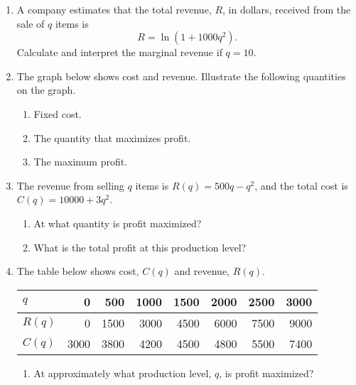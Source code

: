 \documentclass[11pt]{article}
\begin{document}
\drawtitle

\begin{enumerate}
\item A company estimates that the total revenue, $R$, in dollars,
  received from the sale of $q$ items is
  \[
  R = \ln(1 + 1000q^2).
  \]
  Calculate and interpret the marginal revenue if $q = 10$.

  \vfill

\item The graph below shows cost and revenue. Illustrate the following
  quantities on the graph.
  \begin{enumerate}
  \item Fixed cost.
  \item The quantity that maximizes profit.
  \item The maximum profit.
  \end{enumerate}
  \begin{center}

  \end{center}

  \newpage

\item The revenue from selling $q$ items is $R(q) = 500q - q^2$, and
  the total cost is $C(q) = 10000 + 3q^2$.
  \begin{enumerate}
  \item At what quantity is profit maximized?

    \vfill
    
  \item What is the total profit at this production level?

    \vfill
    
  \end{enumerate}
  
  \newpage

\item The table below shows cost, $C(q)$ and revenue, $R(q)$.
  \begin{center}
    \begin{tabular}{l|rrrrrrr}
      $q$ & 0 & 500 & 1000 & 1500 & 2000 & 2500 & 3000\\ \hline
      $R(q)$ & 0 & 1500 & 3000 & 4500 & 6000 & 7500 & 9000\\
      $C(q)$ & 3000 & 3800 & 4200 & 4500 & 4800 & 5500 & 7400
    \end{tabular}
  \end{center}
  \begin{enumerate}
  \item At approximately what production level, $q$, is profit
    maximized?


\end{enumerate}
\end{enumerate}
\end{document}
